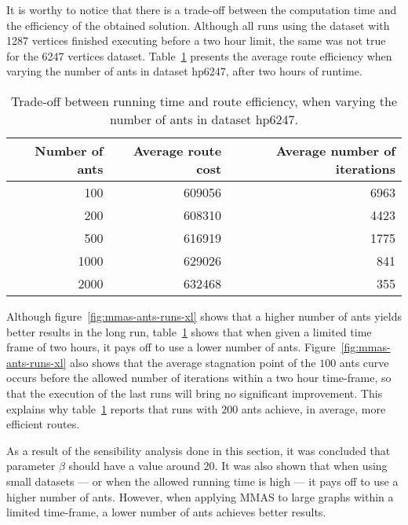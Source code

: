 \newpage
It is worthy to notice that there is a trade-off between the computation time
and the efficiency of the obtained solution. Although all runs using the
dataset with 1287 vertices finished executing before a two hour limit, the
same was not true for the 6247 vertices dataset.
Table~\ref{tab:trade-off-hp6247} presents the average route efficiency when
varying the number of ants in dataset hp6247, after two hours of runtime.

\begin{table}[h!]
  \caption{Trade-off between running time and route efficiency, when varying the
  number of ants in dataset hp6247.}
  \begin{center}
    \begin{tabular}{rrr}
      \hline
      Number of ants & Average route cost & Average number of iterations \\
      \hline
       100 & 609056 & 6963 \\
       200 & 608310 & 4423 \\
       500 & 616919 & 1775 \\
      1000 & 629026 &  841 \\
      2000 & 632468 &  355 \\
      \hline
    \end{tabular}
  \end{center}
  \label{tab:trade-off-hp6247}
\end{table}



Although figure~\ref{fig:mmas-ants-runs-xl} shows that a higher number of ants
yields better results in the long run, table~\ref{tab:trade-off-hp6247} shows
that when given a limited time frame of two hours, it pays off to use a lower
number of ants.  Figure~\ref{fig:mmas-ants-runs-xl} also shows that the average
stagnation point of the $100$ ants curve occurs before the allowed number of
iterations within a two hour time-frame, so that the execution of the last runs
will bring no significant improvement. This explains why
table~\ref{tab:trade-off-hp6247} reports that runs with $200$ ants achieve, in
average, more efficient routes.

As a result of the sensibility analysis done in this section, it was concluded
that parameter $\beta$ should have a value around $20$. It was also shown that
when using small datasets --- or when the allowed running time is high --- it
pays off to use a higher number of ants. However, when applying MMAS to large
graphs within a limited time-frame, a lower number of ants achieves better
results.







